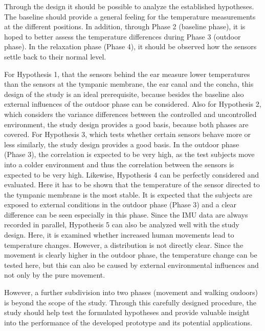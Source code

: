 Through the design it should be possible to analyze the established hypotheses.
The baseline should provide a general feeling for the temperature measurements at the different positions.
In addition, through Phase 2 (baseline phase), it is hoped to better assess the temperature differences during Phase 3 (outdoor phase).
In the relaxation phase (Phase 4), it should be observed how the sensors settle back to their normal level.

For Hypothesis 1, that the sensors behind the ear measure lower temperatures than the sensors at the tympanic membrane, the ear canal and the concha, this design of the study is an ideal prerequisite, because besides the baseline also external influences of the outdoor phase can be considered.
Also for Hypothesis 2, which considers the variance differences between the controlled and uncontrolled environment, the study design provides a good basis, because both phases are covered.
For Hypothesis 3, which tests whether certain sensors behave more or less similarly, the study design provides a good basis.
In the outdoor phase (Phase 3), the correlation is expected to be very high, as the test subjects move into a colder environment and thus the correlation between the sensors is expected to be very high.
Likewise, Hypothesis 4 can be perfectly considered and evaluated. 
Here it has to be shown that the temperature of the sensor directed to the tympanic membrane is the most stable. 
It is expected that the subjects are exposed to external conditions in the outdoor phase (Phase 3) and a clear difference can be seen especially in this phase.
Since the IMU data are always recorded in parallel, Hypothesis 5 can also be analyzed well with the study design.
Here, it is examined whether increased human movements lead to temperature changes. 
However, a distribution is not directly clear. 
Since the movement is clearly higher in the outdoor phase, the temperature change can be tested here, but this can also be caused by external environmental influences and not only by the pure movement.

However, a further subdivision into two phases (movement and walking oudoors) is beyond the scope of the study.
Through this carefully designed procedure, the study should help test the formulated hypotheses and provide valuable insight into the performance of the developed prototype and its potential applications.


